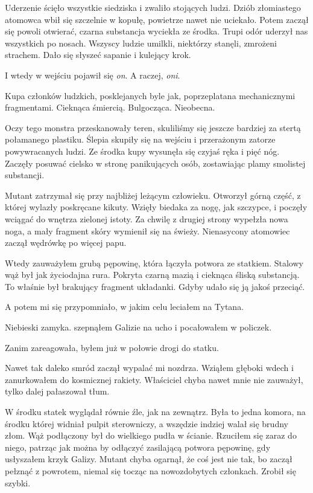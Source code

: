 Uderzenie ścięło wszystkie siedziska i zwaliło stojących ludzi.
Dziób złomiastego atomowca wbił się szczelnie w kopułę, powietrze nawet nie uciekało.
Potem zaczął się powoli otwierać, czarna substancja wyciekła ze środka.
Trupi odór uderzył nas wszystkich po nosach.
Wszyscy ludzie umilkli, niektórzy stanęli, zmrożeni strachem.
Dało się słyszeć sapanie i kulejący krok.

I wtedy w wejściu pojawił się \emph{on}.
A raczej, \emph{oni}.

Kupa członków ludzkich, posklejanych byle jak, poprzeplatana mechanicznymi fragmentami.
Cieknąca śmiercią.
Bulgocząca.
Nieobecna.

Oczy tego monstra przeskanowały teren, skuliliśmy się jeszcze bardziej za stertą połamanego plastiku.
Ślepia skupiły się na wejściu i przerażonym zatorze powywracanych ludzi.
Ze środka kupy wysunęła się czyjaś ręka i pięć nóg.
Zaczęły posuwać cielsko w stronę panikujących osób, zostawiając plamy smolistej substancji.

Mutant zatrzymał się przy najbliżej leżącym człowieku.
Otworzył górną część, z której wylazły poskręcane kikuty.
Wzięły biedaka za nogę, jak szczypce, i poczęły wciągać do wnętrza zielonej istoty.
Za chwilę z drugiej strony wypełzła nowa noga, a mały fragment skóry wymienił się na świeży.
Nienasycony atomowiec zaczął wędrówkę po więcej papu.

Wtedy zauważyłem grubą pępowinę, która łączyła potwora ze statkiem.
Stalowy wąż był jak życiodajna rura.
Pokryta czarną mazią i cieknąca śliską substancją.
To właśnie był brakujący fragment układanki.
Gdyby udało się ją jakoś przeciąć.

A potem mi się przypomniało, w jakim celu leciałem na Tytana.
\begin{dialogue}
	\ds{} Niebieski zamyka. \dm{} szepnąłem Galizie na ucho i pocałowałem w policzek.
\end{dialogue}

Zanim zareagowała, byłem już w połowie drogi do statku.

Nawet tak daleko smród zaczął wypalać mi nozdrza.
Wziąłem głęboki wdech i zanurkowałem do kosmicznej rakiety.
Właściciel chyba nawet mnie nie zauważył, tylko dalej pałaszował tłum.

W środku statek wyglądał równie źle, jak na zewnątrz.
Była to jedna komora, na środku której widniał pulpit sterowniczy, a wszędzie indziej walał się brudny złom.
Wąż podłączony był do wielkiego pudła w ścianie.
Rzuciłem się zaraz do niego, patrząc jak można by odłączyć zasilającą potwora pępowinę, gdy usłyszałem krzyk Galizy.
Mutant chyba ogarnął, że coś jest nie tak, bo zaczął pełznąć z powrotem, niemal się tocząc na nowozdobytych członkach.
Zrobił się szybki.

